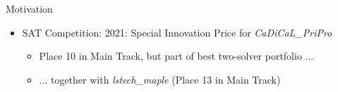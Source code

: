 \documentclass[en]{sdqbeamer}
\begin{document}
\begin{frame}[t]{Motivation}
\begin{itemize}
\begin{itemize}
		\end{itemize}
		\vspace{\baselineskip}
		\pause
		\item SAT Competition: 2021: Special Innovation Price for \emph{CaDiCaL\_PriPro}
		\begin{itemize}
			\item Place 10 in Main Track, but part of best two-solver portfolio ...
			\pause
			\item ... together with \emph{lstech\_maple} (Place 13 in Main Track)
		\end{itemize}
	\end{itemize}
\end{frame}
\end{document}
